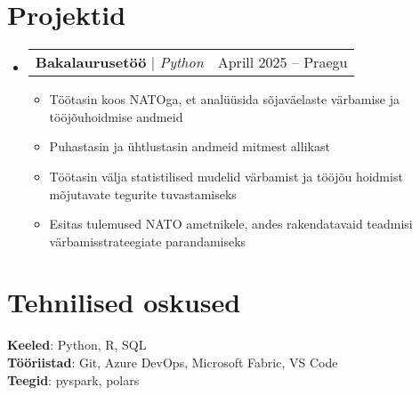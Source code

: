 \documentclass[letterpaper,11pt]{article}
\makeatletter
\newcommand{\resumeItem}[1]{
  \item\small{
    {#1 \vspace{-2pt}}
  }
}
\newcommand{\resumeProjectHeading}[2]{
    \item
    \begin{tabular*}{0.97\textwidth}{l@{\extracolsep{\fill}}r}
      \small#1 & #2 \\
    \end{tabular*}\vspace{-7pt}
}
\newcommand{\resumeSubHeadingListStart}{\begin{itemize}[leftmargin=0.15in, label={}]}
\newcommand{\resumeSubHeadingListEnd}{\end{itemize}}
\newcommand{\resumeItemListStart}{\begin{itemize}}
\newcommand{\resumeItemListEnd}{\end{itemize}\vspace{-5pt}}
\makeatother
\begin{document}
\section{Projektid}
    \resumeSubHeadingListStart
      \resumeProjectHeading
          {\textbf{Bakalaurusetöö} $|$ \emph{Python}}{Aprill 2025 -- Praegu}
          \resumeItemListStart
            \resumeItem{Töötasin koos NATOga, et analüüsida sõjaväelaste värbamise ja tööjõuhoidmise andmeid}
            \resumeItem{Puhastasin ja ühtlustasin andmeid mitmest allikast}
            \resumeItem{Töötasin välja statistilised mudelid värbamist ja tööjõu hoidmist mõjutavate tegurite tuvastamiseks}
            \resumeItem{Esitas tulemused NATO ametnikele, andes rakendatavaid teadmisi värbamisstrateegiate parandamiseks}
          \resumeItemListEnd
    \resumeSubHeadingListEnd



%
\section{Tehnilised oskused}
 \begin{itemize}[leftmargin=0.15in, label={}]
    \small{\item{
     \textbf{Keeled}{: Python, R, SQL} \\
     \textbf{Tööriistad}{: Git, Azure DevOps, Microsoft Fabric, VS Code} \\
     \textbf{Teegid}{: pyspark, polars}
    }}
 \end{itemize}


\end{document}
